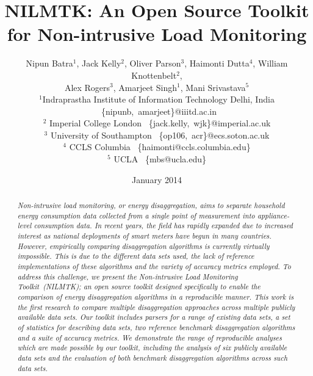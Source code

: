 \documentclass{sig-alternate}
\title{NILMTK: An Open Source Toolkit for Non-intrusive Load Monitoring}
\author{Nipun Batra$^1$, Jack Kelly$^2$, Oliver Parson$^3$, Haimonti Dutta$^4$, William Knottenbelt$^2$,\\ Alex Rogers$^3$, Amarjeet Singh$^1$, Mani Srivastava$^5$\\ 
\small$^1$Indraprastha Institute of Information Technology Delhi, India ~\{nipunb,~amarjeet\}@iiitd.ac.in\\
\small$^2$ Imperial College London ~\{jack.kelly,~wjk\}@imperial.ac.uk\\
\small$^3$ University of Southampton ~\{op106,~acr\}@ecs.soton.ac.uk\\
\small$^4$ CCLS Columbia ~\{haimonti@ccls.columbia.edu\}\\
\small$^5$ UCLA ~\{mbs@ucla.edu\}\\
}
\date{January 2014}
\newcommand\Mark[1]{\textsuperscript#1}
\begin{document}
\maketitle



\begin{abstract}
\noindent
\textit{
Non-intrusive load monitoring, or energy disaggregation, aims to separate household energy consumption data collected from a single point of measurement into appliance-level consumption data. In recent years, the field has rapidly expanded due to increased interest as national deployments of smart meters have begun in many countries. However, empirically comparing disaggregation algorithms is currently virtually impossible. This is due to the different data sets used, the lack of reference implementations of these algorithms and the variety of accuracy metrics employed. To address this challenge, we present the Non-intrusive Load Monitoring Toolkit~(NILMTK); an open source toolkit designed specifically to enable the comparison of energy disaggregation algorithms in a reproducible manner. This work is the first research to compare multiple disaggregation approaches across multiple publicly available data sets. Our toolkit includes parsers for a range of existing data sets, a set of statistics for describing data sets, two reference benchmark disaggregation algorithms and a suite of accuracy metrics. We demonstrate the range of reproducible analyses which are made possible by our toolkit, including the analysis of six publicly available data sets and the evaluation of both benchmark disaggregation algorithms across such data sets.
}
\end{abstract}
\end{document}
